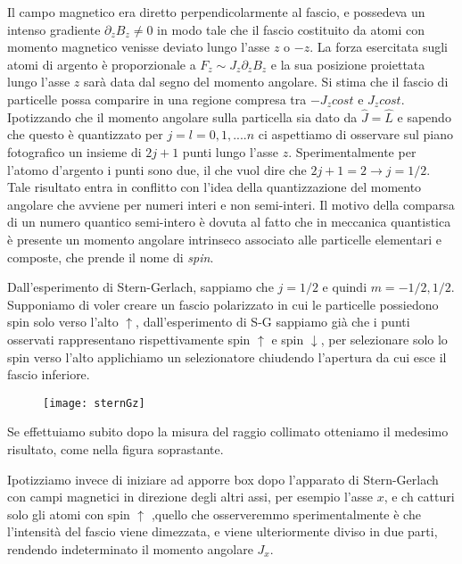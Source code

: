 Il campo magnetico era diretto perpendicolarmente al fascio, e possedeva un intenso gradiente $\partial_z B_z \neq 0$ in modo tale che il fascio costituito da atomi con momento magnetico venisse deviato lungo l'asse $z$ o $-z$. La forza esercitata sugli atomi di argento \`e proporzionale a $F_z \sim J_z \partial_zB_z$ e la sua posizione proiettata lungo l'asse $z$ sar\`a data dal segno del momento angolare.  Si stima che il fascio di particelle possa comparire in una regione compresa tra $-J_zcost $ e $J_z cost$. Ipotizzando che il momento angolare sulla particella sia dato da  $\hat{J} = \hat{L}$  e sapendo che questo \`e  quantizzato per $j=l = 0,1,....n$ ci aspettiamo di osservare  sul piano fotografico un insieme di $2j+1$ punti lungo l'asse $z$. Sperimentalmente per l'atomo d'argento i punti sono due, il che vuol dire che $2j+1 = 2  \rightarrow j = 1/2$. 
Tale risultato entra in conflitto con l'idea della quantizzazione del momento angolare che avviene per numeri interi e non semi-interi. Il motivo della comparsa di un numero quantico semi-intero \`e dovuta al fatto che in meccanica quantistica \`e presente un momento angolare intrinseco associato alle particelle elementari e composte, che prende il nome di \textit{spin}.
\newline

\noindent Dall'esperimento di Stern-Gerlach, sappiamo che $j = 1/2$ e quindi $m = -1/2,1/2$. Supponiamo di voler creare un fascio polarizzato in cui le particelle possiedono spin solo verso l'alto $\uparrow$,  dall'esperimento di S-G sappiamo gi\`a che i punti osservati rappresentano rispettivamente spin $\uparrow$ e spin $\downarrow$, per selezionare solo lo spin verso l'alto applichiamo un selezionatore chiudendo l'apertura da cui esce il fascio inferiore.

 
\begin{figure}[!ht]
\vspace{0.2in}
\texttt{[image: sternGz]}	
\centering
\vspace{0.1in}
\end{figure}
Se effettuiamo subito dopo la misura del raggio collimato otteniamo il medesimo risultato, come nella figura soprastante.

Ipotizziamo invece di iniziare ad apporre box dopo l'apparato di Stern-Gerlach con campi magnetici in direzione degli altri assi, per esempio l'asse $x$,  e ch catturi solo gli atomi con spin $\uparrow$ ,quello che osserveremmo sperimentalmente \`e che l'intensit\`a del fascio viene dimezzata, e viene ulteriormente diviso in due parti, rendendo indeterminato il momento angolare $J_x$.

